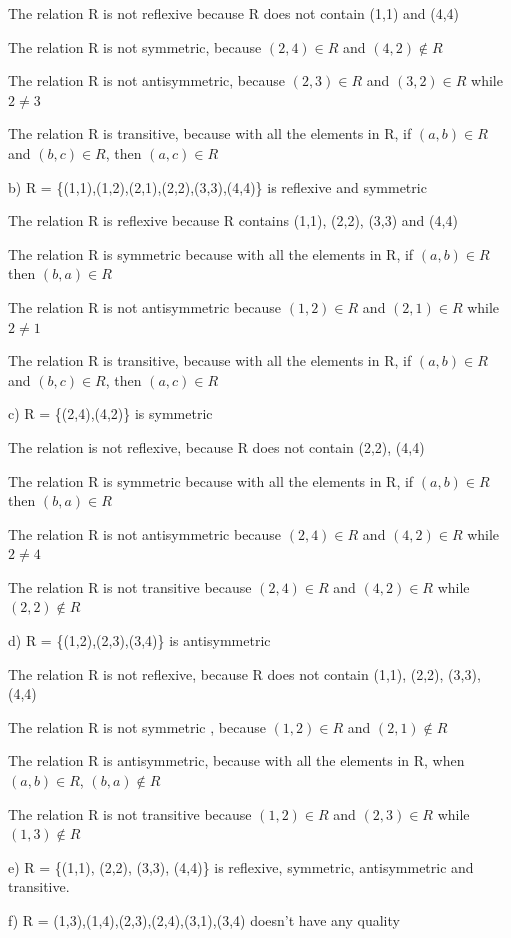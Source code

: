 \documentclass[12pt]{amsart}
\begin{document}
The relation R is not reflexive because R does not contain (1,1) and (4,4)

The relation R is not symmetric, because $(2,4)\in R$ and $(4,2)\notin R$

The relation R is not antisymmetric, because $(2,3)\in R$ and  $(3,2)\in R$ while $2\neq 3$

The relation R is transitive, because with all the elements in R, if $(a,b)\in R$ and $(b,c)\in R$, then $(a,c)\in R$

b) R = \{(1,1),(1,2),(2,1),(2,2),(3,3),(4,4)\} is reflexive and symmetric

The relation R is reflexive because R contains (1,1), (2,2), (3,3) and (4,4)

The relation R is symmetric because  with all the elements in R, if $(a,b)\in R$ then  $(b,a)\in R$

The relation R is not antisymmetric because  $(1,2)\in R$ and  $(2,1)\in R$ while $2\neq 1$

The relation R is transitive, because with all the elements in R, if $(a,b)\in R$ and $(b,c)\in R$, then $(a,c)\in R$

c) R = \{(2,4),(4,2)\} is symmetric

The relation is not reflexive, because R does not contain (2,2), (4,4)

The relation R is symmetric because  with all the elements in R, if $(a,b)\in R$ then  $(b,a)\in R$

The relation R is not antisymmetric because  $(2,4)\in R$ and  $(4,2)\in R$ while $2\neq 4$

The relation R is not transitive because $(2,4)\in R$ and  $(4,2)\in R$ while $(2,2)\notin R$

d) R = \{(1,2),(2,3),(3,4)\} is antisymmetric

The relation R is not reflexive, because R does not contain (1,1), (2,2), (3,3), (4,4)

The relation R is not symmetric , because $(1,2)\in R$ and $(2,1)\notin R$

The relation R is antisymmetric, because with all the elements in R, when $(a,b)\in R$, $(b,a)\notin R$

The relation R is not transitive because $(1,2)\in R$ and  $(2,3)\in R$ while $(1,3)\notin R$

e) R = \{(1,1), (2,2), (3,3), (4,4)\} is reflexive, symmetric, antisymmetric and transitive.

f) R = {(1,3),(1,4),(2,3),(2,4),(3,1),(3,4)} doesn't have any quality
\end{document}
